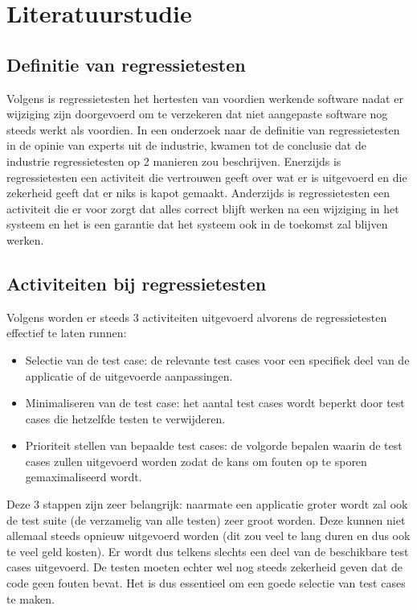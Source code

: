 \section{Literatuurstudie}
\label{sec:literatuurstudie}

\subsection{Definitie van regressietesten}

Volgens \textcite{EngstroemRuneson2010} is regressietesten het hertesten van voordien werkende software nadat er wijziging zijn doorgevoerd om te verzekeren dat niet aangepaste software nog steeds werkt als voordien. In een onderzoek naar de definitie van regressietesten in de opinie van experts uit de industrie, kwamen \cite{Minhas2017} tot de conclusie dat de industrie regressietesten op 2 manieren zou beschrijven. Enerzijds is regressietesten een activiteit die vertrouwen geeft over wat er is uitgevoerd en die zekerheid geeft dat er niks is kapot gemaakt. Anderzijds is regressietesten een activiteit die er voor zorgt dat alles correct blijft werken na een wijziging in het systeem en het is een garantie dat het systeem ook in de toekomst zal blijven werken.

\subsection{Activiteiten bij regressietesten}

Volgens  \textcite{AhlamAnsari2016} worden er steeds 3 activiteiten uitgevoerd alvorens de regressietesten effectief te laten runnen:

\begin{itemize}
    \item Selectie van de test case: de relevante test cases voor een specifiek deel van de applicatie of de uitgevoerde aanpassingen.
    \item Minimaliseren van de test case: het aantal test cases wordt beperkt door test cases die hetzelfde testen te verwijderen. 
    \item Prioriteit stellen van bepaalde test cases: de volgorde bepalen waarin de test cases zullen uitgevoerd worden zodat de kans om fouten op te sporen gemaximaliseerd wordt.
\end{itemize}

Deze 3 stappen zijn zeer belangrijk: naarmate een applicatie groter wordt zal ook de test suite (de verzamelig van alle testen) zeer groot worden. Deze kunnen niet allemaal steeds opnieuw uitgevoerd worden (dit zou veel te lang duren en dus ook te veel geld kosten). Er wordt dus telkens slechts een deel van de beschikbare test cases uitgevoerd. De testen moeten echter wel nog steeds zekerheid geven dat de code geen fouten bevat. Het is dus essentieel om een goede selectie van test cases te maken. 

